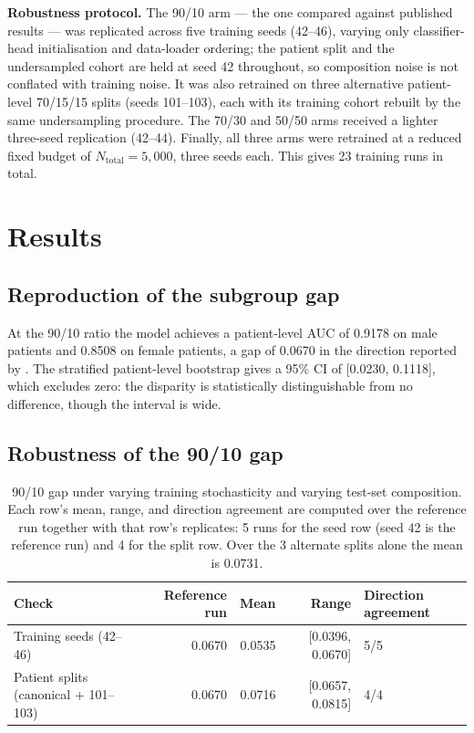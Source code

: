 \documentclass[11pt]{article}
\begin{document}
\textbf{Robustness protocol.} The 90/10 arm --- the one compared against published results --- was replicated across five training seeds (42--46), varying only classifier-head initialisation and data-loader ordering; the patient split and the undersampled cohort are held at seed 42 throughout, so composition noise is not conflated with training noise. It was also retrained on three alternative patient-level 70/15/15 splits (seeds 101--103), each with its training cohort rebuilt by the same undersampling procedure. The 70/30 and 50/50 arms received a lighter three-seed replication (42--44). Finally, all three arms were retrained at a reduced fixed budget of $N_{\text{total}}=5{,}000$, three seeds each. This gives 23 training runs in total.

\section{Results}
\label{sec:results}

\subsection{Reproduction of the subgroup gap}

At the 90/10 ratio the model achieves a patient-level AUC of 0.9178 on male patients and 0.8508 on female patients, a gap of 0.0670 in the direction reported by \cite{larrazabal2020}. The stratified patient-level bootstrap gives a 95\% CI of [0.0230, 0.1118], which excludes zero: the disparity is statistically distinguishable from no difference, though the interval is wide.

\subsection{Robustness of the 90/10 gap}

\begin{table}[H]
\centering
\begin{tabular}{lrrrl}
\toprule
Check & Reference run & Mean & Range & Direction agreement \\
\midrule
Training seeds (42--46) & 0.0670 & 0.0535 & [0.0396, 0.0670] & 5/5 \\
Patient splits (canonical + 101--103) & 0.0670 & 0.0716 & [0.0657, 0.0815] & 4/4 \\
\bottomrule
\end{tabular}
\caption{90/10 gap under varying training stochasticity and varying test-set composition. Each row's mean, range, and direction agreement are computed over the reference run together with that row's replicates: 5 runs for the seed row (seed 42 is the reference run) and 4 for the split row. Over the 3 alternate splits alone the mean is 0.0731.}
\label{tab:robustness}
\end{table}
\end{document}
